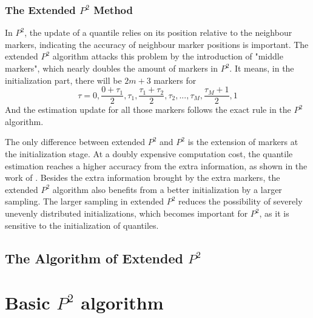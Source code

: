 \subsubsection{The Extended $P^2$ Method}
In $P^2$, the update of a quantile relies on its position relative to the neighbour markers, indicating the accuracy of neighbour marker positions is important.
The extended $P^2$ algorithm attacks this problem by the introduction of "middle markers",  which nearly doubles the amount of markers in $P^2$. 
It means, in the initialization part, there will be $2m+3$ markers for
$$
\tau = 0, \frac{0+\tau_1}{2}, \tau_1, \frac{\tau_1 + \tau_2}{2}, \tau_2, ..., \tau_{M}, \frac{\tau_M+1}{2}, 1
$$
And the estimation update for all those markers follows the exact rule in the $P^2$ algorithm.

The only difference between extended $P^2$ and $P^2$ is the extension of markers at the initialization stage. At a doubly expensive computation cost, the quantile estimation reaches a higher accuracy from the extra information, as shown in the work of \citeauthor{raatikainenSequentialProcedureSimultaneous1993}\cite{raatikainenSequentialProcedureSimultaneous1993}. Besides the extra information brought by the extra markers, the extended $P^2$ algorithm also benefits from a better initialization by a larger sampling. The larger sampling in extended $P^2$ reduces the possibility of severely unevenly distributed initializations, which becomes important for  $P^2$, as it is sensitive to the initialization of quantiles.

\subsection{The Algorithm of Extended $P^2$}
\label{subsec: algo_extended_{p2}}

\section{Basic $P^2$ algorithm}

